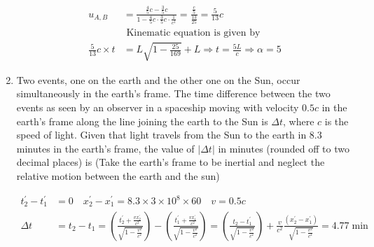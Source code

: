 \begin{enumerate}
\begin{answer}
	\begin{align*}
	u_{A, B}&=\frac{\frac{4}{5} c-\frac{3}{5} c}{1-\frac{4}{5} c \cdot \frac{3}{5} c \cdot \frac{1}{c^{2}}}=\frac{\frac{c}{5}}{\frac{13}{25}}=\frac{5}{13} c	\\
	&\text { Kinematic equation is given by }\\
	\frac{5}{13} c \times t&=L \sqrt{1-\frac{25}{169}}+L \Rightarrow t=\frac{5 L}{c} \Rightarrow \alpha=5
	\end{align*}
\end{answer}
	\item Two events, one on the earth and the other one on the Sun, occur simultaneously in the earth's frame. The time difference between the two events as seen by an observer in a spaceship moving with velocity $0.5 c$ in the earth's frame along the line joining the earth to the Sun is $\Delta t$, where $c$ is the speed of light. Given that light travels from the Sun to the earth in $8.3$ minutes in the earth's frame, the value of $|\Delta t|$ in minutes (rounded off to two decimal places) is
	(Take the earth's frame to be inertial and neglect the relative motion between the earth and the sun)
	{}
\begin{answer}
\begin{align*}
t_{2}^{\prime}-t_{1}^{\prime}&=0 \quad x_{2}^{\prime}-x_{1}^{\prime}=8.3 \times 3 \times 10^{8} \times 60 \quad v=0.5 c\\
\Delta t&=t_{2}-t_{1}=\left(\frac{t_{2}^{\prime}+\frac{v x_{2}^{\prime}}{c^{2}}}{\sqrt{1-\frac{v^{2}}{c^{2}}}}\right)-\left(\frac{t_{1}^{\prime}+\frac{v x_{1}^{\prime}}{c^{2}}}{\sqrt{1-\frac{v^{2}}{c^{2}}}}\right)=\left(\frac{t_{2}-t_{1}^{\prime}}{\sqrt{1-\frac{v^{2}}{c^{2}}}}\right)+\frac{v}{c^{2}} \frac{\left(x_{2}^{\prime}-x_{1}^{\prime}\right)}{\sqrt{1-\frac{v^{2}}{c^{2}}}}=4.77 \min
\end{align*}	
\end{answer}
\end{enumerate}